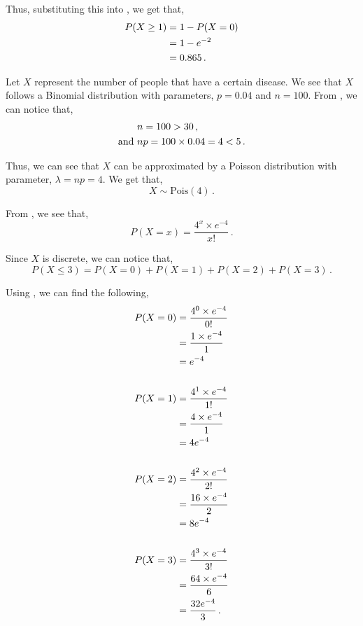 \begin{subquestions}
Thus, substituting this into , we get that,
\begin{align}
	 P(X \geq 1) & = 1 - P(X=0) \nonumber \\
	             & = 1 - e^{-2} \nonumber \\
	             & = 0.865 \,.  
\end{align}


\subquestion 

Let $X$ represent the number of people that have a certain disease. We see that $X$ follows a Binomial distribution with parameters, $p=0.04$ and $n=100$. From , we can notice that,
\begin{align}
	& n=100>30 \,, \nonumber \\
	\text{and} ~ & np=100 \times 0.04 = 4<5 \,. \nonumber 
\end{align}

Thus, we can see that $X$ can be approximated by a Poisson distribution with parameter, $\lambda=np=4$. We get that,
\begin{equation}
	X \sim \text{Pois}(4) \,.
\end{equation}

From , we see that,
\begin{equation}
	P(X = x) =\frac{4^x \times e^{-4}}{x!} \,. \label{2009:q4:PoisEqn3}
\end{equation}

Since $X$ is discrete, we can notice that,
\begin{equation}
	P(X \leq 3) = P(X=0)+P(X=1)+P(X=2)+P(X=3) \,. \label{2009:q4:Pois4}
\end{equation}

Using , we can find the following,
\begin{align}
	P(X=0) & = \frac{4^0 \times e^{-4}}{0!} \nonumber \\
	       & = \frac{1 \times e^{-4}}{1} \nonumber \\
	       & = e^{-4} \\ \nonumber \\
	P(X=1) & = \frac{4^1 \times e^{-4}}{1!} \nonumber \\
	       & = \frac{4 \times e^{-4}}{1} \nonumber \\
	       & = 4e^{-4} \\ \nonumber \\
	P(X=2) & = \frac{4^2 \times e^{-4}}{2!} \nonumber \\
	       & = \frac{16 \times e^{-4}}{2} \nonumber \\
	       & = 8e^{-4} \\ \nonumber \\
	P(X=3) & = \frac{4^3 \times e^{-4}}{3!} \nonumber \\
	       & = \frac{64 \times e^{-4}}{6} \nonumber \\
	       & = \frac{32e^{-4}}{3}\,.
\end{align}


\end{subquestions}
